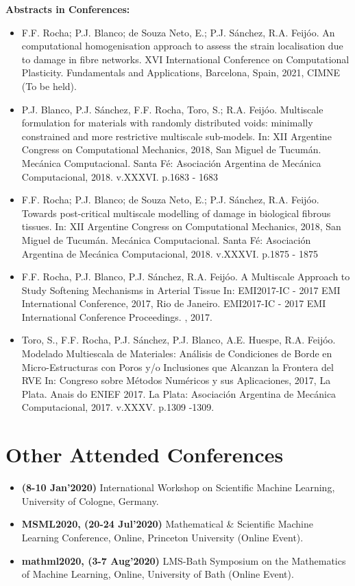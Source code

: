 \documentclass[letterpaper]{twentysecondcv} %
\begin{document}
\item \textbf{Abstracts in Conferences:} 
\begin{itemize}
    \item F.F. Rocha; P.J. Blanco; de Souza Neto, E.; P.J. Sánchez, R.A. Feijóo. An computational homogenisation approach to assess the strain localisation due to damage in fibre networks. XVI International Conference on Computational Plasticity. Fundamentals and Applications, Barcelona, Spain, 2021, CIMNE (To be held).
	\item P.J. Blanco, P.J. Sánchez, F.F. Rocha, Toro, S.; R.A. Feijóo.
	Multiscale formulation for materials with randomly distributed voids: minimally constrained and more restrictive multiscale sub-models. In: XII Argentine Congress on
	Computational Mechanics, 2018, San Miguel de Tucumán.
	Mecánica Computacional. Santa Fé: Asociación Argentina de Mecánica Computacional, 2018. v.XXXVI.
	p.1683 - 1683
	\item F.F. Rocha; P.J. Blanco; de Souza Neto, E.; P.J. Sánchez, R.A. Feijóo.
	Towards post-critical multiscale modelling of damage in biological fibrous tissues.
	In: XII Argentine Congress on Computational Mechanics, 2018, San Miguel de Tucumán.
	Mecánica Computacional. Santa Fé: Asociación Argentina de Mecánica Computacional, 2018. v.XXXVI.
	p.1875 - 1875
	\item F.F. Rocha, P.J. Blanco, P.J. Sánchez, R.A. Feijóo.
	A Multiscale Approach to Study Softening Mechanisms in Arterial Tissue In: EMI2017-IC - 2017 EMI
	International Conference, 2017, Rio de Janeiro. EMI2017-IC - 2017 EMI International Conference Proceedings. , 2017.
	\item Toro, S., F.F. Rocha, P.J. Sánchez, P.J. Blanco, A.E. Huespe, R.A. Feijóo.
	Modelado Multiescala de Materiales: Análisis de Condiciones de Borde en Micro-Estructuras con Poros y/o
	Inclusiones que Alcanzan la Frontera del RVE In: Congreso sobre Métodos Numéricos y sus Aplicaciones,
	2017, La Plata. Anais do ENIEF 2017. La Plata: Asociación Argentina de Mecánica Computacional, 2017. v.XXXV. p.1309 -1309.
\end{itemize}


\newpage

\makeprofile

\section{Other Attended Conferences}
\begin{itemize} 
 \item \textbf{(8-10 Jan'2020)} International Workshop on Scientific Machine Learning, University of Cologne, Germany.
\item \textbf{MSML2020, (20-24 Jul'2020)}  Mathematical & Scientific Machine Learning Conference,
 Online, Princeton University (Online Event).
\item \textbf{mathml2020, (3-7 Aug'2020)}  LMS-Bath Symposium on the Mathematics of Machine Learning, Online, University of Bath (Online Event).
\end{itemize}
\end{document}
